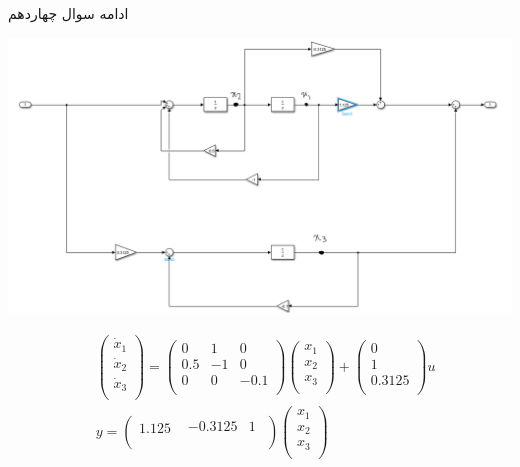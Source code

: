 \documentclass{article}
\begin{document}
\begin{problem}{ادامه سوال چهاردهم}
	\raggedleft
	
	\includegraphics[width = \linewidth]{Second Series/16.png}
	
	
	 \begin{align}
		& \left( \begin{matrix}
			{{{\dot{x}}}_{1}}  \\
			{{{\dot{x}}}_{2}}  \\
			{{{\dot{x}}}_{3}}  \\
		\end{matrix} \right)=\left( \begin{matrix}
			0 & 1 & 0  \\
			0.5 & -1 & 0  \\
			0 & 0 & -0.1  \\
		\end{matrix} \right)\left( \begin{matrix}
			{{x}_{1}}  \\
			{{x}_{2}}  \\
			{{x}_{3}}  \\
		\end{matrix} \right)+\left( \begin{matrix}
			0  \\
			1  \\
			0.3125  \\
		\end{matrix} \right)u \\ 
		& y=\left( \begin{matrix}
			1.125 & \begin{matrix}
				-0.3125 & 1  \\
			\end{matrix}  \\
		\end{matrix} \right)\left( \begin{matrix}
			{{x}_{1}}  \\
			{{x}_{2}}  \\
			{{x}_{3}}  \\
		\end{matrix} \right) \\ 
	\end{align}
	

	
	
\end{problem}
\end{document}
